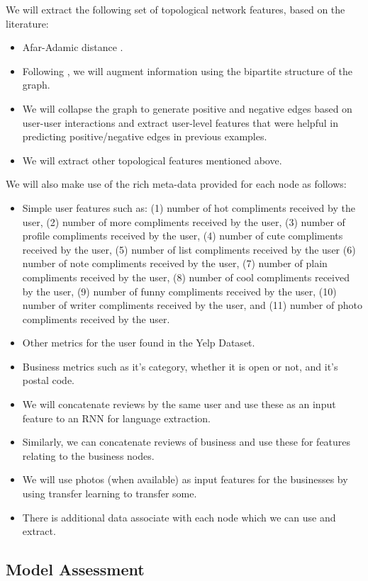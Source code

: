 \documentclass[letterpaper, 11 pt, conference]{ieeeconf}  %
\begin{document}
We will extract the following set of topological network features, based on the literature:
\begin{itemize}
\item Afar-Adamic distance \cite{Adamic01friendsand}.
\item Following \cite{5562752}, we will augment information using the bipartite structure of the graph.
\item We will collapse the graph to generate positive and negative edges based on user-user interactions and extract user-level features that were helpful in predicting positive/negative edges in previous examples.
\item We will extract other topological features mentioned above.
\end{itemize}

We will also make use of the rich meta-data provided for each node as follows:
\begin{itemize}
\item Simple user features such as: (1) number of hot compliments received by the user, (2) number of more compliments received by the user, (3) number of profile compliments received by the user, (4) number of cute compliments received by the user, (5) number of list compliments received by the user (6) number of note compliments received by the user, (7) number of plain compliments received by the user, (8) number of cool compliments received by the user, (9) number of funny compliments received by the user, (10) number of writer compliments received by the user, and (11) number of photo compliments received by the user.
\item Other metrics for the user found in the Yelp Dataset.
\item Business metrics such as it's category, whether it is open or not, and it's postal code.
\item We will concatenate reviews by the same user and use these as an input feature to an RNN for language extraction.
\item Similarly, we can concatenate reviews of business and use these for features relating to the business nodes.
\item We will use photos (when available) as input features for the businesses by using transfer learning to transfer some.
\item There is additional data associate with each node which we can use and extract.
\end{itemize}

\subsection{Model Assessment}
\end{document}

